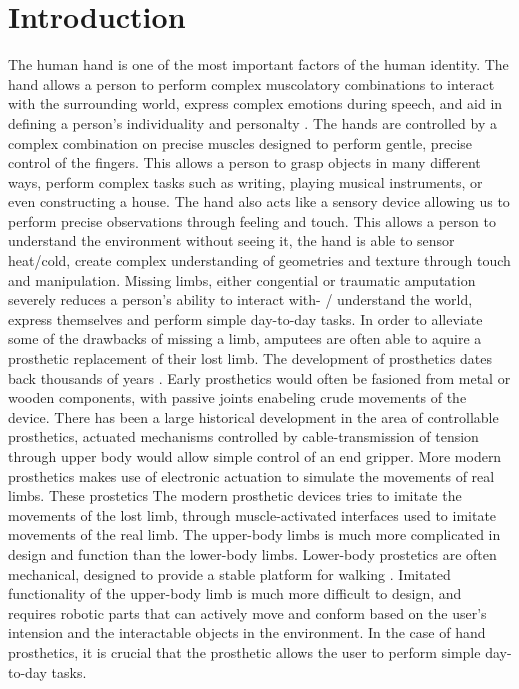 \documentclass[../main.tex]{subfiles}
\begin{document}
\section{Introduction}

The human hand is one of the most important factors of the human identity.
The hand allows a person  to perform complex muscolatory combinations to interact with the surrounding world, express complex emotions during speech, and aid in defining a person's individuality and personalty \cite{Douglashands}.
The hands are controlled by a complex combination on precise muscles designed to perform gentle, precise control of the fingers.
This allows a person to grasp objects in many different ways, perform complex tasks such as writing, playing musical instruments, or even constructing a house.
The hand also acts like a sensory device allowing us to perform precise observations through feeling and touch.
This allows a person to understand the environment without seeing it, the hand is able to sensor heat/cold, create complex understanding of geometries and texture through touch and manipulation.
Missing limbs, either \gls{congential} or \gls{traumatic} amputation severely reduces a person's ability to interact with- / understand the world, express themselves and perform simple day-to-day tasks.
In order to alleviate some of the drawbacks of missing a limb, amputees are often able to aquire a prosthetic replacement of their lost limb.
The development of prosthetics dates back thousands of years \cite{Kevin2014}.
Early prosthetics would often be fasioned from metal or wooden components, with passive joints enabeling crude movements of the device. 
There has been a large historical development in the area of controllable prosthetics, actuated mechanisms controlled by cable-transmission of tension through upper body would allow simple control of an end gripper.
More modern prosthetics makes use of electronic actuation to simulate the movements of real limbs.
These prostetics 
The modern prosthetic devices tries to imitate the movements of the lost limb, through muscle-activated interfaces used to imitate movements of the real limb. 
The upper-body limbs is much more complicated in design and function than the lower-body limbs.
Lower-body prostetics are often mechanical, designed to provide a stable platform for walking \cite{mechanicallegs}.
Imitated functionality of the upper-body limb is much more difficult to design, and requires robotic parts that can actively move and conform based on the user's intension and the interactable objects in the environment.  
In the case of hand prosthetics, it is crucial that the prosthetic allows the user to perform simple day-to-day tasks.
\end{document}
